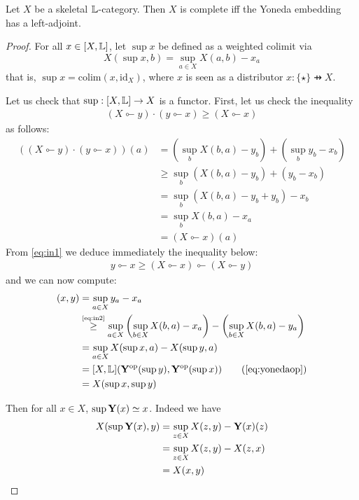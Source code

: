 \begin{proposition}\label{prop:yonedasup}
Let $X$ be a skeletal $\mathbb{L}$-category. Then $X$ is complete iff the Yoneda embedding has a left-adjoint.
\end{proposition}
\begin{proof}
 For all $ x\in [X,\mathbb{L}]$, let $\sup x$ be defined as a weighted colimit via
$$
X(\sup x, b)= \sup_{a\in X} X(a,b)-x_{a}
$$
that is, $\sup  x= \mathrm{colim}(  x, \mathrm{id}_{X})$, where $ x$ is seen as a distributor $x:\{\star\}\pfun X$.


Let us check that $\sup: [X,\mathbb{L}]\to X$ is a functor. First, let us check the  inequality
\begin{align}\label{eq:in1}
(X\multimapinv y)\cdot ( y\multimapinv x)\geq (X\multimapinv x)\end{align}
as follows:
\begin{align*}
\left((X\multimapinv  y)\cdot ( y\multimapinv x)\right)(a)&=
 \left (\sup_{b}X(b,a)- y_{b}\right)+\left(\sup_{b} y_{b}-x_{b}\right)\\
&\geq
\sup_{b}(X(b,a)- y_{b})+( y_{b}-x_{b})
\\
&=\sup_{b}(X(b,a)- y_{b}+ y_{b})-x_{b}
\\
&=\sup_{b} X(b,a)-x_{a}\\
&= (X\multimapinv x)(a)
\end{align*}
From \eqref{eq:in1} we deduce immediately the inequality below:
\begin{align}\label{eq:in2}
 y\multimapinv x \geq (X\multimapinv x)\multimapinv(X\multimapinv y)
\end{align}
and we can now compute:
\begin{align*}
[X,\Lawv](x,  y)&= \sup_{a\in X} y_{a}-x_{a}\\
 &\stackrel{\tiny\eqref{eq:in2}}{\geq}
 \sup_{a\in X} \left( \sup_{b\in X}X(b,a)-x_{a}\right) -\left(  \sup_{b\in X}X(b,a)- y_{a}   \right )\\
 &= \sup_{a\in X}X(\sup x, a)-X(\sup  y, a)\\
 &= [X,\Lawv](\B Y^{\mathrm{op}}(\sup y),\B Y^{\mathrm{op}}(\sup x))
 \tag{\ref{eq:yonedaop}}
 \\
&=X(\sup x, \sup  y)
\end{align*}


Then for all $x\in X$, $\sup \mathbf{Y}(x)\simeq x$. Indeed we have 
\begin{align*}
X(\sup \mathbf{Y}(x), y) & = \sup_{z\in X}X(z,y) -\mathbf{Y}(x)(z) \\
& = \sup_{z\in X}X(z,y)-X(z,x)\\
&= X(x,y)
\end{align*}
%


\end{proof}
